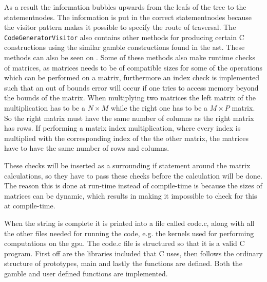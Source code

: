 As a result the information bubbles upwards from the leafs of the tree to the statementnodes.
The information is put in the correct statementnodes because the visitor pattern makes it possible to specify the route of traversal.
The \texttt{CodeGeneratorVisitor} also contains other methods for producing certain C constructions using the similar \gls{gamble} constructions found in the \acrshort{ast}.
These methods can also be seen on .
Some of these methods also make runtime checks of matrices, as matrices needs to be of compatible sizes for some of the operations which can be performed on a matrix, furthermore an index check is implemented such that an out of bounds error will occur if one tries to access memory beyond the bounds of the matrix.
When multiplying two matrices the left matrix of the multiplication has to be a $ N \times M $ while the right one has to be a $ M \times P $ matrix.
So the right matrix must have the same number of columns as the right matrix has rows.
If performing a matrix index multiplication, where every index is multiplied with the corresponding index of the the other matrix, the matrices have to have the same number of rows and columns.

These checks will be inserted as a surrounding if statement around the matrix calculations, so they have to pass these checks before the calculation will be done.
The reason this is done at run-time instead of compile-time is because the sizes of matrices can be dynamic, which results in making it impossible to check for this at compile-time.

When the string is complete it is printed into a file called code.c, along with all the other files needed for running the code, e.g. the kernels used for performing computations on the \acrshort{gpu}.
The code.c file is structured so that it is a valid C program.
First off are the libraries included that C uses, then follows the ordinary structure of prototypes, main and lastly the functions are defined.
Both the \gls{gamble} and user defined functions are implemented.